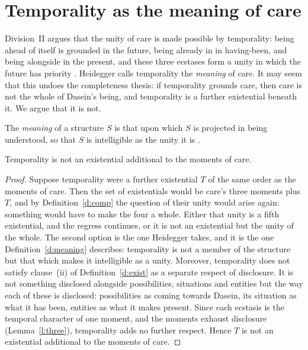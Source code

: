 \documentclass{situationist-preprint}
\begin{document}
\section{Temporality as the meaning of care}\label{s:temp}

Division~II argues that the unity of care is made possible by temporality: being ahead of itself is grounded in the future, being already in in having-been, and being alongside in the present, and these three ecstases form a unity in which the future has priority \citep[\S65]{Heidegger1927}. Heidegger calls temporality the \emph{meaning} of care. It may seem that this undoes the completeness thesis: if temporality grounds care, then care is not the whole of Dasein's being, and temporality is a further existential beneath it. We argue that it is not.

\begin{definition}[Meaning]\label{d:meaning}
The \emph{meaning} of a structure $S$ is that upon which $S$ is projected in being understood, so that $S$ is intelligible as the unity it is \citep[\S\S32, 65]{Heidegger1927}.
\end{definition}

\begin{proposition}\label{p:temp}
Temporality is not an existential additional to the moments of care.
\end{proposition}

\begin{proof}
Suppose temporality were a further existential $T$ of the same order as the moments of care. Then the set of existentials would be care's three moments plus $T$, and by Definition~\ref{d:comp} the question of their unity would arise again: something would have to make the four a whole. Either that unity is a fifth existential, and the regress continues, or it is not an existential but the unity of the whole. The second option is the one Heidegger takes, and it is the one Definition~\ref{d:meaning} describes: temporality is not a member of the structure but that which makes it intelligible as a unity. Moreover, temporality does not satisfy clause~(ii) of Definition~\ref{d:exist} as a separate respect of disclosure. It is not something disclosed alongside possibilities, situations and entities but the way each of these is disclosed: possibilities as coming towards Dasein, its situation as what it has been, entities as what it makes present. Since each ecstasis is the temporal character of one moment, and the moments exhaust disclosure (Lemma~\ref{l:three}), temporality adds no further respect. Hence $T$ is not an existential additional to the moments of care.
\end{proof}
\end{document}
